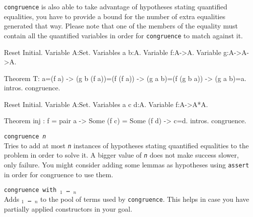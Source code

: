\begin{coq_example*}
{\tt congruence} is also able to take advantage of hypotheses stating quantified equalities, you have to provide a bound for the number of extra equalities generated that way. Please note that one of the members of the equality must contain all the quantified variables in order for {\tt congruence} to match against it.

\begin{coq_eval}
Reset Initial.
Variable A:Set.
Variables a b:A.
Variable f:A->A.
Variable g:A->A->A.
\end{coq_eval}

\begin{coq_example}
Theorem T:
  a=(f a) -> (g b (f a))=(f (f a)) -> (g a b)=(f (g b a)) -> (g a b)=a.
intros.
congruence.
\end{coq_example}

\begin{coq_eval}
Reset Initial.
Variable A:Set.
Variables a c d:A.
Variable f:A->A*A.
\end{coq_eval}

\begin{coq_example}
Theorem inj : f = pair a -> Some (f c) = Some (f d) -> c=d.
intros.
congruence.
\end{coq_example}

\begin{Variants}
 \item {\tt congruence {\sl n}}\\
  Tries to add at most {\tt \sl n} instances of hypotheses stating quantified equalities to the problem in order to solve it. A bigger value of {\tt \sl n} does not make success slower, only failure. You might consider adding some lemmas as hypotheses using {\tt assert} in order for congruence to use them.

\end{Variants}

\begin{Variants}
\item {\tt congruence with \term$_1$ \dots\ \term$_n$}\\
  Adds {\tt \term$_1$ \dots\ \term$_n$} to the pool of terms used by
  {\tt congruence}. This helps in case you have partially applied
  constructors in your goal.
\end{Variants}


\end{coq_example*}
